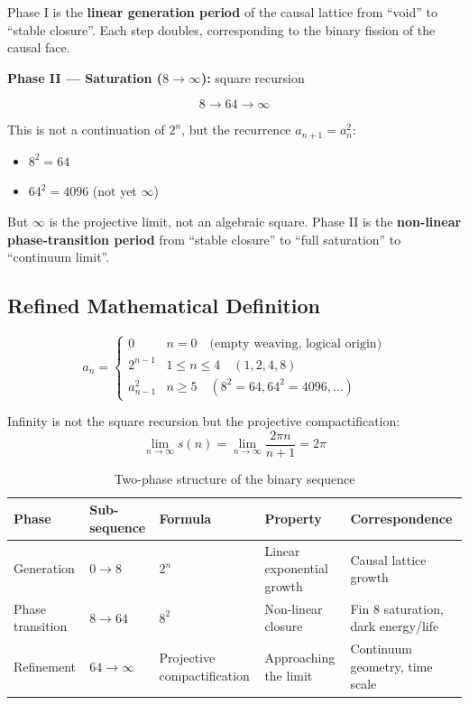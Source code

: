 \documentclass[aps,prd,twocolumn,nofootinbib,floatfix]{revtex4-2}
\begin{document}
Phase I is the \textbf{linear generation period} of the causal lattice from ``void'' to ``stable closure''. Each step doubles, corresponding to the binary fission of the causal face.

\textbf{Phase II --- Saturation ($8 \to \infty$):} square recursion

\[
8 \to 64 \to \infty
\]

This is not a continuation of $2^n$, but the recurrence $a_{n+1} = a_n^2$:
\begin{itemize}
    \item $8^2 = 64$
    \item $64^2 = 4096$ (not yet $\infty$)
\end{itemize}

But $\infty$ is the projective limit, not an algebraic square. Phase II is the \textbf{non-linear phase-transition period} from ``stable closure'' to ``full saturation'' to ``continuum limit''.

\subsection{Refined Mathematical Definition}

\[
\boxed{
a_n =
\begin{cases}
0 & n = 0 \quad \text{(empty weaving, logical origin)} \\
2^{n-1} & 1 \le n \le 4 \quad (1, 2, 4, 8) \\
a_{n-1}^2 & n \ge 5 \quad (8^2 = 64, 64^2 = 4096, \dots)
\end{cases}
}
\]

Infinity is not the square recursion but the projective compactification:
\[
\lim_{n\to\infty} s(n) = \lim_{n\to\infty} \frac{2\pi n}{n+1} = 2\pi
\]

\begin{table}[h]
\centering
\begin{tabular}{|l|l|l|l|l|}
\hline
Phase & Sub-sequence & Formula & Property & Correspondence \\
\hline
Generation & $0 \to 8$ & $2^n$ & Linear exponential growth & Causal lattice growth \\
Phase transition & $8 \to 64$ & $8^2$ & Non-linear closure & Fin 8 saturation, dark energy/life \\
Refinement & $64 \to \infty$ & Projective compactification & Approaching the limit & Continuum geometry, time scale \\
\hline
\end{tabular}
\caption{Two-phase structure of the binary sequence}
\end{table}
\end{document}
